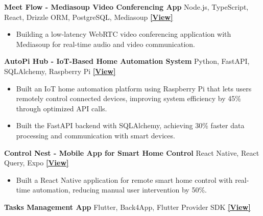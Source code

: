 \documentclass[10pt,a4paper]{article}
\newcommand{\projectEntry}[3]{
    \textbf{#1} \hfill #2 \quad
    \href{#3}{\textbf{[View]}}
}
\begin{document}

\projectEntry
{Meet Flow - Mediasoup Video Conferencing App}
{Node.js, TypeScript, React, Drizzle ORM, PostgreSQL, Mediasoup}
{https://meet-flow-ms.vercel.app/}

\begin{itemize}
    \item Building a low-latency WebRTC video conferencing application with Mediasoup for real-time audio and video communication.
\end{itemize}


\projectEntry
{AutoPi Hub - IoT-Based Home Automation System}
{Python, FastAPI, SQLAlchemy, Raspberry Pi}
{https://github.com/Tauqeer-Ahmed-99/AutoPi-Hub}

\begin{itemize}
    \item Built an IoT home automation platform using Raspberry Pi that lets users remotely control connected devices, improving system efficiency by 45\% through optimized API calls.
    
    \item Built the FastAPI backend with SQLAlchemy, achieving 30\% faster data processing and communication with smart devices.
\end{itemize}


\projectEntry
{Control Nest - Mobile App for Smart Home Control}
{React Native, React Query, Expo}
{https://github.com/Tauqeer-Ahmed-99/Control-Nest/releases/tag/v1.0.1}

\begin{itemize}
    \item Built a React Native application for remote smart home control with real-time automation, reducing manual user intervention by 50\%.
\end{itemize}


\projectEntry
{Tasks Management App}
{Flutter, Back4App, Flutter Provider SDK}
{https://github.com/Tauqeer-Ahmed-99/Tasks-Management-Flutter-BITS-Pilani}
\end{document}
